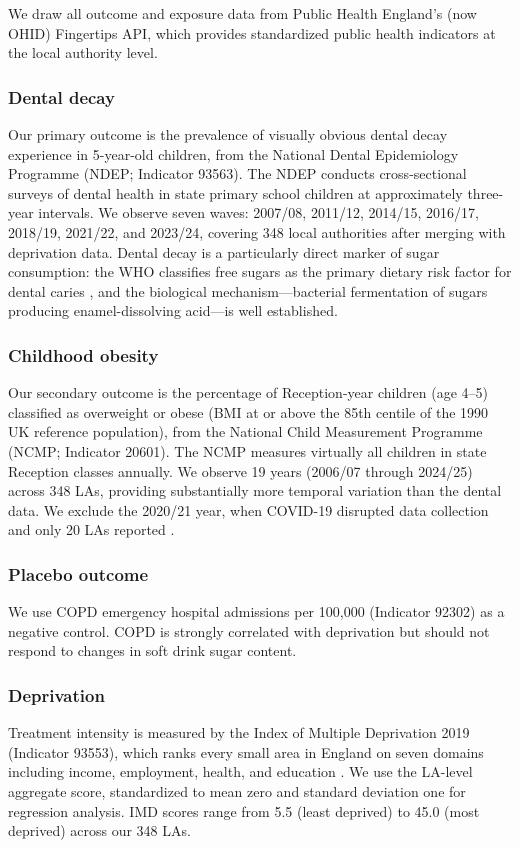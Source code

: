 \documentclass[12pt]{article}
\begin{document}
We draw all outcome and exposure data from Public Health England's (now OHID) Fingertips API, which provides standardized public health indicators at the local authority level.

\subsubsection*{Dental decay} Our primary outcome is the prevalence of visually obvious dental decay experience in 5-year-old children, from the National Dental Epidemiology Programme (NDEP; Indicator 93563). The NDEP conducts cross-sectional surveys of dental health in state primary school children at approximately three-year intervals. We observe seven waves: 2007/08, 2011/12, 2014/15, 2016/17, 2018/19, 2021/22, and 2023/24, covering 348 local authorities after merging with deprivation data. Dental decay is a particularly direct marker of sugar consumption: the WHO classifies free sugars as the primary dietary risk factor for dental caries \citep{who2015, moynihan2014}, and the biological mechanism---bacterial fermentation of sugars producing enamel-dissolving acid---is well established.

\subsubsection*{Childhood obesity} Our secondary outcome is the percentage of Reception-year children (age 4--5) classified as overweight or obese (BMI at or above the 85th centile of the 1990 UK reference population), from the National Child Measurement Programme (NCMP; Indicator 20601). The NCMP measures virtually all children in state Reception classes annually. We observe 19 years (2006/07 through 2024/25) across 348 LAs, providing substantially more temporal variation than the dental data. We exclude the 2020/21 year, when COVID-19 disrupted data collection and only 20 LAs reported \citep{ncmp2023}.

\subsubsection*{Placebo outcome} We use COPD emergency hospital admissions per 100,000 (Indicator 92302) as a negative control. COPD is strongly correlated with deprivation but should not respond to changes in soft drink sugar content.

\subsubsection*{Deprivation} Treatment intensity is measured by the Index of Multiple Deprivation 2019 (Indicator 93553), which ranks every small area in England on seven domains including income, employment, health, and education \citep{noble2019}. We use the LA-level aggregate score, standardized to mean zero and standard deviation one for regression analysis. IMD scores range from 5.5 (least deprived) to 45.0 (most deprived) across our 348 LAs.
\end{document}
